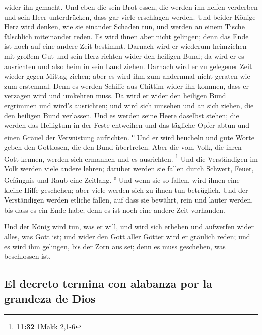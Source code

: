 wider ihn gemacht.  Und eben die sein Brot essen, die
werden ihn helfen verderben und sein Heer unterdrücken, dass gar viele
erschlagen werden.  Und beider Könige Herz wird denken,
wie sie einander Schaden tun, und werden an einem Tische fälschlich
miteinander reden. Es wird ihnen aber nicht gelingen; denn das Ende ist
noch auf eine andere Zeit bestimmt.  Darnach wird er
wiederum heimziehen mit großem Gut und sein Herz richten wider den
heiligen Bund; da wird er es ausrichten und also heim in sein Land
ziehen.  Darnach wird er zu gelegener Zeit wieder gegen
Mittag ziehen; aber es wird ihm zum andernmal nicht geraten wie zum
erstenmal.  Denn es werden Schiffe aus Chittim wider ihn
kommen, dass er verzagen wird und umkehren muss. Da wird er wider den
heiligen Bund ergrimmen und wird's ausrichten; und wird sich umsehen und
an sich ziehen, die den heiligen Bund verlassen.  Und es
werden seine Heere daselbst stehen; die werden das Heiligtum in der
Feste entweihen und das tägliche Opfer abtun und einen Gräuel der
Verwüstung aufrichten. \textsuperscript{c}  Und er wird
heucheln und gute Worte geben den Gottlosen, die den Bund übertreten.
Aber die vom Volk, die ihren Gott kennen, werden sich ermannen und es
ausrichten. \footnote{\textbf{11:32} 1Makk 2,1-6}  Und
die Verständigen im Volk werden viele andere lehren; darüber werden sie
fallen durch Schwert, Feuer, Gefängnis und Raub eine Zeitlang.
\textsuperscript{e}  Und wenn sie so fallen, wird ihnen
eine kleine Hilfe geschehen; aber viele werden sich zu ihnen tun
betrüglich.  Und der Verständigen werden etliche fallen,
auf dass sie bewährt, rein und lauter werden, bis dass es ein Ende habe;
denn es ist noch eine andere Zeit vorhanden.

 Und der König wird tun, was er will, und wird sich
erheben und aufwerfen wider alles, was Gott ist; und wider den Gott
aller Götter wird er gräulich reden; und es wird ihm gelingen, bis der
Zorn aus sei; denn es muss geschehen, was beschlossen ist.

\hypertarget{el-decreto-termina-con-alabanza-por-la-grandeza-de-dios}{%
\subsection{El decreto termina con alabanza por la grandeza de
Dios}\label{el-decreto-termina-con-alabanza-por-la-grandeza-de-dios}}

